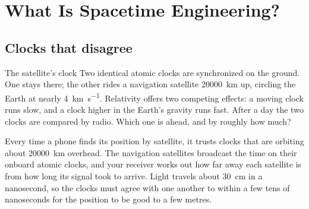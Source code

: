 \documentclass[paper=letter,fontsize=10pt,twoside=true,twocolumn=true,open=right,chapterprefix=false,numbers=noenddot]{scrbook}
\begin{document}
\mainmatter
{}
\chapter{What Is Spacetime Engineering?}\label{ch:what-is}
\section{Clocks that disagree}\label{sec:gps}
\begin{thought}{The satellite's clock}
Two identical atomic clocks are synchronized on the ground. One stays there; the other rides a navigation satellite \SI{20000}{\kilo\metre} up, circling the Earth at nearly \SI{4}{\kilo\metre\per\second}. Relativity offers two competing effects: a moving clock runs slow, and a clock higher in the Earth's gravity runs fast. After a day the two clocks are compared by radio. Which one is ahead, and by roughly how much?
\end{thought}
Every time a phone finds its position by satellite, it trusts clocks that are orbiting about \SI{20000}{\kilo\metre} overhead. The navigation satellites broadcast the time on their onboard atomic clocks, and your receiver works out how far away each satellite is from how long its signal took to arrive. Light travels about \SI{30}{\centi\metre} in a nanosecond, so the clocks must agree with one another to within a few tens of nanoseconds for the position to be good to a few metres.
\end{document}
